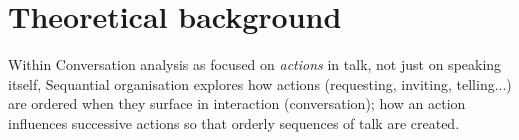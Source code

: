 \documentclass[11pt]{article}
\begin{document}
\section*{Theoretical background}{
	Within Conversation analysis as focused on \textit{actions} in talk, not just on speaking itself,
	Sequantial organisation explores how actions (requesting, inviting, telling...) are ordered when they surface in interaction (conversation); how an action influences successive actions so that orderly sequences of talk are created.
    
}
\end{document}
